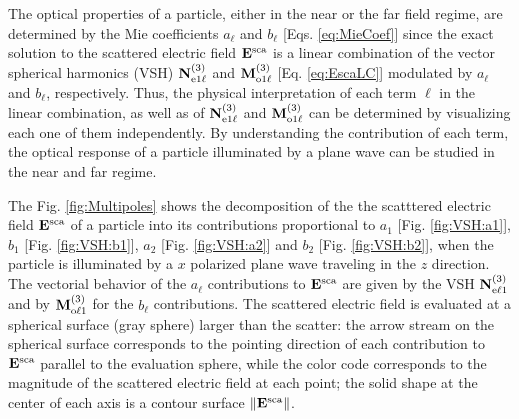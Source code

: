 
The optical properties of a particle, either in the near or the far field regime,  are determined by the Mie coefficients   $a_\ell$ and $b_\ell$ [Eqs. \eqref{eq:MieCoef}] since the exact solution to the scattered electric field $\vb{E}^\text{sca}$ is a linear combination of the vector spherical harmonics (VSH) $\vb{N}^{(3)}_{\text{e}1\ell}$ and $\vb{M}^{(3)}_{\text{o}1\ell}$ [Eq. \eqref{eq:EscaLC}] modulated by  $a_\ell$ and $b_\ell$, respectively. Thus, the physical interpretation of each term $\ell$ in the linear combination, as well as of $\vb{N}^{(3)}_{\text{e}1\ell}$ and $\vb{M}^{(3)}_{\text{o}1\ell}$ can be determined by visualizing each one of them independently. By understanding the contribution of each term, the optical response of a particle illuminated by a plane wave can be studied in the near and far regime.

The Fig. \ref{fig:Multipoles} shows the decomposition of the the scatttered electric field  $\vb{E}^\text{sca}$ of a particle into its contributions proportional to $a_1$ [Fig. \ref{fig:VSH:a1}], $b_1$ [Fig. \ref{fig:VSH:b1}], $a_2$ [Fig. \ref{fig:VSH:a2}] and $b_2$ [Fig. \ref{fig:VSH:b2}], when the particle is illuminated by a $x$ polarized plane wave traveling in the $z$ direction. The vectorial behavior of the $a_\ell$ contributions to $\vb{E}^\text{sca}$ are given by the VSH $\vb{N}^{(3)}_{\text{e}\ell 1}$ and by $\vb{M}^{(3)}_{\text{o}\ell 1}$ for the $b_\ell$ contributions. The  scattered electric field  is evaluated at a spherical surface (gray sphere) larger than the scatter: the arrow stream on the spherical surface corresponds to the pointing direction of each contribution to $\vb{E}^\text{sca}$ parallel to the evaluation sphere, while the color code corresponds to the magnitude of the scattered electric field at each point; the solid shape at the center of each axis is a contour surface $\norm{\vb{E}^\text{sca}}$.
%

